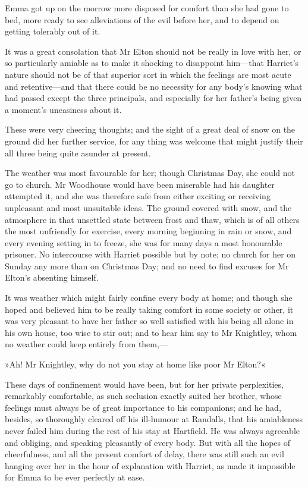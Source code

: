 Emma got up on the morrow more disposed for comfort than she had gone to bed, more ready to see alleviations of the evil before her, and to depend on getting tolerably out of it.

It was a great consolation that Mr Elton should not be really in love with her, or so particularly amiable as to make it shocking to disappoint him—that Harriet's nature should not be of that superior sort in which the feelings are most acute and retentive—and that there could be no necessity for any body's knowing what had passed except the three principals, and especially for her father's being given a moment's uneasiness about it.

These were very cheering thoughts; and the sight of a great deal of snow on the ground did her further service, for any thing was welcome that might justify their all three being quite asunder at present.

The weather was most favourable for her; though Christmas Day, she could not go to church. Mr Woodhouse would have been miserable had his daughter attempted it, and she was therefore safe from either exciting or receiving unpleasant and most unsuitable ideas. The ground covered with snow, and the atmosphere in that unsettled state between frost and thaw, which is of all others the most unfriendly for exercise, every morning beginning in rain or snow, and every evening setting in to freeze, she was for many days a most honourable prisoner. No intercourse with Harriet possible but by note; no church for her on Sunday any more than on Christmas Day; and no need to find excuses for Mr Elton's absenting himself.

It was weather which might fairly confine every body at home; and though she hoped and believed him to be really taking comfort in some society or other, it was very pleasant to have her father so well satisfied with his being all alone in his own house, too wise to stir out; and to hear him say to Mr Knightley, whom no weather could keep entirely from them,—

»Ah! Mr Knightley, why do not you stay at home like poor Mr Elton?«

These days of confinement would have been, but for her private perplexities, remarkably comfortable, as such seclusion exactly suited her brother, whose feelings must always be of great importance to his companions; and he had, besides, so thoroughly cleared off his ill-humour at Randalls, that his amiableness never failed him during the rest of his stay at Hartfield. He was always agreeable and obliging, and speaking pleasantly of every body. But with all the hopes of cheerfulness, and all the present comfort of delay, there was still such an evil hanging over her in the hour of explanation with Harriet, as made it impossible for Emma to be ever perfectly at ease.
